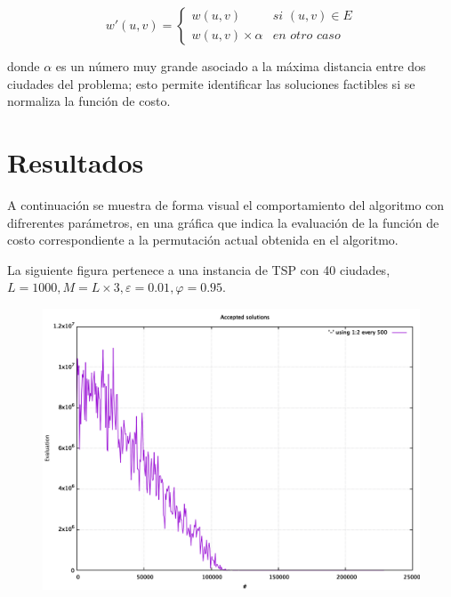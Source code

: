 \documentclass[12pt, letterpaper]{article}
\begin{document}
\begin{equation}
w'(u,v) = \begin{cases}
    w(u,v) & \textit{si } (u,v) \in E\\
    w(u,v) \times \alpha & \textit{en otro caso}
    \end{cases}
\end{equation}

donde $\alpha$ es un número muy grande asociado a la máxima distancia entre dos ciudades del problema; esto permite identificar las soluciones factibles si se normaliza la función de costo.

\section{Resultados}
A continuación se muestra de forma visual el comportamiento del algoritmo con difrerentes parámetros, en una gráfica que indica la evaluación de la función de costo correspondiente a la permutación actual obtenida en el algoritmo.
\par
La siguiente figura pertenece a una instancia de TSP con 40 ciudades, $L = 1000, M = L\times3, \varepsilon = 0.01, \varphi = 0.95$.

\begin{figure}[H]
    \centering
    \includegraphics[width=\linewidth]{1.png}
    \label{fig:1}
\end{figure}
\end{document}
